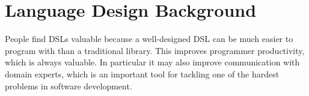 \section{Language Design Background}
People find DSLs valuable because a well-designed DSL can be much easier to program with than a traditional library. This improves programmer productivity, which is always valuable. In particular it may also improve communication with domain experts, which is an important tool for tackling one of the hardest problems in software development.